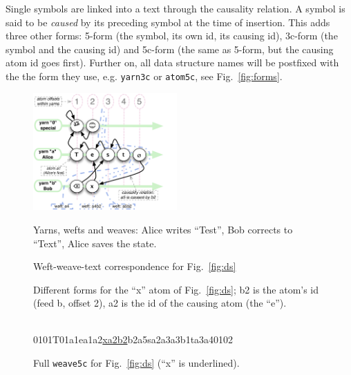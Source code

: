 \documentclass{sig-alternate}
\begin{document}
Single symbols are linked into a text through the causality relation.
A symbol is said to be \emph{caused} by its preceding symbol at the time of insertion.
This adds three other forms: 5-form (the symbol, its own id, its causing id), 3c-form (the symbol and the causing id) and 5c-form (the same as 5-form, but the causing atom id goes first).
Further on, all data structure names will be postfixed with the the form they use, e.g. {\tt yarn3c} or {\tt atom5c}, see Fig.~\ref{fig:forms}.

\begin{figure}[t]
\includegraphics[width=0.49\textwidth]{feedsnweaves-5.pdf}
\caption{Yarns, wefts and weaves: Alice writes ``Test'', Bob corrects to ``Text'', Alice saves the state. \label{fig:ds} }

\caption{Weft-weave-text correspondence for Fig.~\ref{fig:ds} \label{fig:wwt}}

\caption {Different forms for the ``x'' atom of Fig.~\ref{fig:ds}; b2 is the atom's id (feed b, offset 2), a2 is the id of the causing atom (the ``e''). \label{fig:forms}}
~\\
{ {\aum}0101{T}01a1{e}a1a2{\underline{xa2b2}}{\zero}b2a5{s}a2a3{\bsp}a3b1{t}a3a4{\eoa}0102 }
\caption{ Full {\tt weave5c} for Fig.~\ref{fig:ds} (``x'' is underlined). \label{fig:w5c} }
\end{figure}
\end{document}
